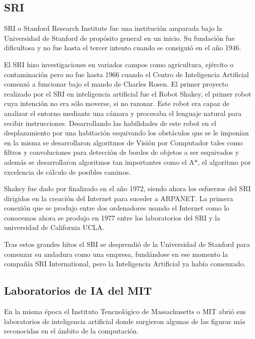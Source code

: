 \subsection{SRI}
SRI o Stanford Research Institute fue una institución amparada bajo la Universidad de Stanford de propósito general en un inicio. Su fundación fue dificultosa y no fue hasta el tercer intento cuando se consiguió en el año 1946.

\vspace{10px}

El SRI hizo investigaciones en variados campos como agricultura, ejército o contaminación pero no fue hasta 1966 cuando el Centro de Inteligencia Artificial comenzó a funcionar bajo el mando de Charles Rosen. El primer proyecto realizado por el SRI en inteligencia artificial fue el Robot Shakey, el primer robot cuya intención no era sólo moverse, si no razonar. Este robot era capaz de analizar el entorno mediante una cámara y procesaba el lenguaje natural para recibir instrucciones. Desarrollando las habilidades de este robot en el desplazamiento por una habitación esquivando los obstáculos que se le imponían en la misma se desarrollaron algoritmos de Visión por Computador tales como filtros y convoluciones para detección de bordes de objetos a ser esquivados y además se desarrollaron algoritmos tan importantes como el A*, el algoritmo por excelencia de cálculo de posibles caminos.

\vspace{10px}

Shakey fue dado por finalizado en el año 1972, siendo ahora los esfuerzos del SRI dirigidos en la creación del Internet para suceder a ARPANET. La primera conexión que se produjo entre dos ordenadores usando el Internet como lo conocemos ahora se produjo en 1977 entre los laboratorios del SRI y la universidad de California UCLA.

\vspace{10px}

Tras estos grandes hitos el SRI se desprendió de la Universidad de Stanford para comenzar su andadura como una empresa, fundándose en ese momento la compañía SRI International, pero la Inteligencia Artificial ya había comenzado.

\subsection{Laboratorios de IA del MIT}
En la misma época el Instituto Tencnológico de Massachusetts o MIT abrió sus laboratorios de inteligencia artificial donde surgieron algunas de las figuras más reconocidas en el ámbito de la computación.


